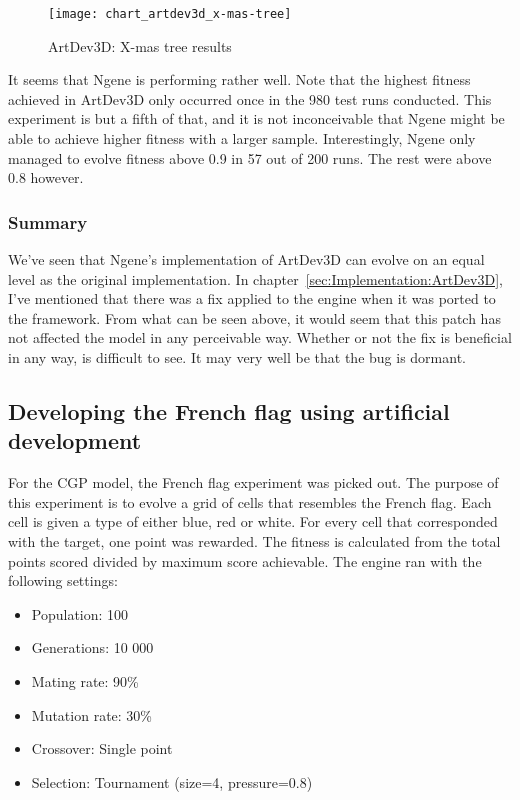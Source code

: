 \begin{figure}[!ht]
	\centering
	\texttt{[image: chart\_artdev3d\_x-mas-tree]}
	\caption{ArtDev3D: X-mas tree results}
	\label{fig:chart_artdev3d_x-mas-tree}
\end{figure}

It seems that Ngene is performing rather well. Note that the highest fitness achieved in ArtDev3D only occurred once in the 980 test runs conducted. This experiment is but a fifth of that, and it is not inconceivable that Ngene might be able to achieve higher fitness with a larger sample. Interestingly, Ngene only managed to evolve fitness above 0.9 in 57 out of 200 runs. The rest were above 0.8 however.

\subsubsection{Summary}
We've seen that Ngene's implementation of ArtDev3D can evolve on an equal level as the original implementation. In chapter~\ref{sec:Implementation:ArtDev3D}, I've mentioned that there was a fix applied to the engine when it was ported to the framework. From what can be seen above, it would seem that this patch has not affected the model in any perceivable way. Whether or not the fix is beneficial in any way, is difficult to see. It may very well be that the bug is dormant.


\subsection{Developing the French flag using artificial development}
For the CGP model, the French flag experiment was picked out. The purpose of this experiment is to evolve a grid of cells that resembles the French flag. Each cell is given a type of either blue, red or white. For every cell that corresponded with the target, one point was rewarded. The fitness is calculated from the total points scored divided by maximum score achievable. The engine ran with the following settings:

\begin{itemize}
	\itemsep=-2pt
	\item Population: 100
	\item Generations: 10 000
	\item Mating rate: 90\%
	\item Mutation rate: 30\%
	\item Crossover: Single point
	\item Selection: Tournament (size=4, pressure=0.8)
\end{itemize}

